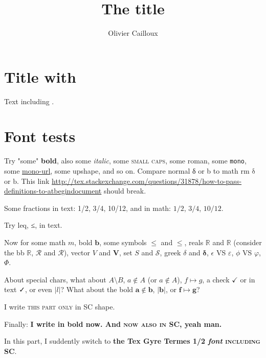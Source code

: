 \documentclass[version=last, pagesize, twoside=off, bibliography=totoc, 14pt, a4paper, french, english]{scrartcl}
\begin{document}
\title{The title}
\author{Olivier Cailloux}
\subject{Ze subject}%
\makeatletter
\makeatother
\maketitle

\section{Title with \electreTRI}
Text including \electreTRI.

\section{Font tests}
Try "some" \textbf{bold}, also some \textit{italic}, some \textsc{small caps}, some \textrm{roman}, some \texttt{mono}, some \url{mono-url}, some \textup{upshape}, and so on. Compare normal δ or b to math rm $\mathrm{\delta}$ or $\mathrm{b}$.
This link \url{http://tex.stackexchange.com/questions/31878/how-to-pass-definitions-to-atbegindocument} should break.

Some fractions in text: 1/2, 3/4, 10/12, and in math: $1/2$, $3/4$, $10/12$.

Try leq, ≤, in text.

Now for some math $m$, bold $\mathbf{b}$, some symbols $≤$ and $\mathbf{≤}$, reals $ℝ$ and $\mathbf{ℝ}$ (consider the bb $\mathbb{R}$, $\mathcal{R}$ and $\mathscr{R}$), vector $V$ and $\mathbf{V}$, set $S$ and $\mathcal{S}$, greek $\delta$ and $\mathbf{\delta}$, $\epsilon$ VS $\varepsilon$, $\phi$ VS $\varphi$, $\Phi$.

About special chars, what about $A \setminus B$, $a ∉ A$ (or $a \notin A$), $f \mapsto g$, a check $✓$ or in text ✓, or even $\lvert l\rvert$? What about the bold $\mathbf{a \notin b}$, $\mathbf{\lvert b\rvert}$, or $\mathbf{f \mapsto g}$?

I write \textsc{this part only} in SC shape.

Finally: \textbf{I write in bold now. And \textsc{now also in SC}, yeah man.}

{In this part, I suddently \texgyretermesfamily switch to \textbf{the Tex Gyre Termes 1/2 \textit{font} \textsc{including SC}}.}

\end{document}
